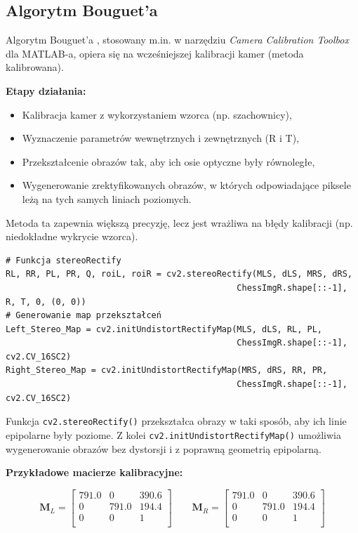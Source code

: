 \documentclass[magisterska]{pracadypl}
\begin{document}
\subsection*{Algorytm Bouguet’a}

Algorytm Bouguet’a \cite{bouget}, stosowany m.in. w narzędziu \textit{Camera Calibration Toolbox} dla MATLAB-a, opiera się na wcześniejszej kalibracji kamer (metoda kalibrowana).

\textbf{Etapy działania:}
\begin{itemize}
    \item Kalibracja kamer z wykorzystaniem wzorca (np. szachownicy),
    \item Wyznaczenie parametrów wewnętrznych i zewnętrznych (R i T),
    \item Przekształcenie obrazów tak, aby ich osie optyczne były równoległe,
    \item Wygenerowanie zrektyfikowanych obrazów, w których odpowiadające piksele leżą na tych samych liniach poziomych.
\end{itemize}

Metoda ta zapewnia większą precyzję, lecz jest wrażliwa na błędy kalibracji (np. niedokładne wykrycie wzorca).

\begin{lstlisting}[style=mypython]
# Funkcja stereoRectify
RL, RR, PL, PR, Q, roiL, roiR = cv2.stereoRectify(MLS, dLS, MRS, dRS,
                                              ChessImgR.shape[::-1], R, T, 0, (0, 0))
# Generowanie map przekształceń
Left_Stereo_Map = cv2.initUndistortRectifyMap(MLS, dLS, RL, PL,
                                              ChessImgR.shape[::-1], cv2.CV_16SC2)
Right_Stereo_Map = cv2.initUndistortRectifyMap(MRS, dRS, RR, PR,
                                              ChessImgR.shape[::-1], cv2.CV_16SC2)
\end{lstlisting}

Funkcja \texttt{cv2.stereoRectify()} przekształca obrazy w taki sposób, aby ich linie epipolarne były poziome. Z kolei \texttt{cv2.initUndistortRectifyMap()} umożliwia wygenerowanie obrazów bez dystorsji i z poprawną geometrią epipolarną.

\textbf{Przykładowe macierze kalibracyjne:}

\[
\mathbf{M}_L =
\begin{bmatrix}
791.0 & 0 & 390.6 \\
0 & 791.0 & 194.4 \\
0 & 0 & 1 \\
\end{bmatrix}
\qquad
\mathbf{M}_R =
\begin{bmatrix}
791.0 & 0 & 390.6 \\
0 & 791.0 & 194.4 \\
0 & 0 & 1 \\
\end{bmatrix}
\]
\end{document}
